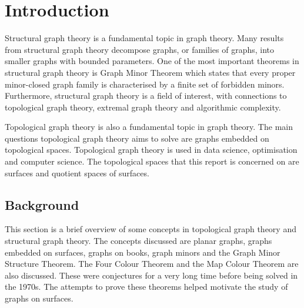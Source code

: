 \chapter{Introduction}\label{sec:introduction}
Structural graph theory is a fundamental topic in graph theory. Many results from structural graph theory decompose graphs, or families of graphs, into smaller graphs with bounded parameters. One of the most important theorems in structural graph theory is \textcite{robertsonGraphMinorsXX2004} Graph Minor Theorem which states that every proper minor-closed graph family is characterised by a finite set of forbidden minors. Furthermore, structural graph theory is a field of interest, with connections to topological graph theory, extremal graph theory and algorithmic complexity. 

Topological graph theory is also a fundamental topic in graph theory. The main questions topological graph theory aims to solve are graphs embedded on topological spaces. Topological graph theory is used in data science, optimisation and computer science. The topological spaces that this report is concerned on are surfaces and quotient spaces of surfaces. 






\section{Background}\label{sec:background}
This section is a brief overview of some concepts in topological graph theory and structural graph theory. The concepts discussed are planar graphs, graphs embedded on surfaces, graphs on books, graph minors and the Graph Minor Structure Theorem. The Four Colour Theorem and the Map Colour Theorem are also discussed. These were conjectures for a very long time before being solved in the 1970s. The attempts to prove these theorems helped motivate the study of graphs on surfaces.













